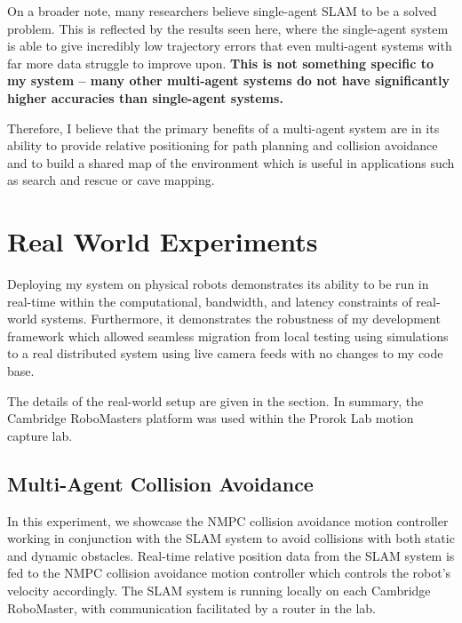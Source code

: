 On a broader note, many researchers believe single-agent SLAM to be a solved problem. This is reflected by the results seen here, where the single-agent system is able to give incredibly low trajectory errors that even multi-agent systems with far more data struggle to improve upon. \textbf{This is not something specific to my system – many other multi-agent systems do not have significantly higher accuracies than single-agent systems.}

Therefore, I believe that the primary benefits of a multi-agent system are in its ability to provide relative positioning for path planning and collision avoidance and to build a shared map of the environment which is useful in applications such as search and rescue or cave mapping.



\section{Real World Experiments}
\label{sec:real-world-experiments}
Deploying my system on physical robots demonstrates its ability to be run in real-time within the computational, bandwidth, and latency constraints of real-world systems. Furthermore, it demonstrates the robustness of my development framework which allowed seamless migration from local testing using simulations to a real distributed system using live camera feeds with no changes to my code base.

The details of the real-world setup are given in the  section. In summary, the Cambridge RoboMasters platform was used within the Prorok Lab motion capture lab.

\subsection{Multi-Agent Collision Avoidance}
\label{sec:multi-agent-collision-avoidance}
In this experiment, we showcase the NMPC collision avoidance motion controller working in conjunction with the SLAM system to avoid collisions with both static and dynamic obstacles. Real-time relative position data from the SLAM system is fed to the NMPC collision avoidance motion controller which controls the robot's velocity accordingly. The SLAM system is running locally on each Cambridge RoboMaster, with communication facilitated by a router in the lab.

